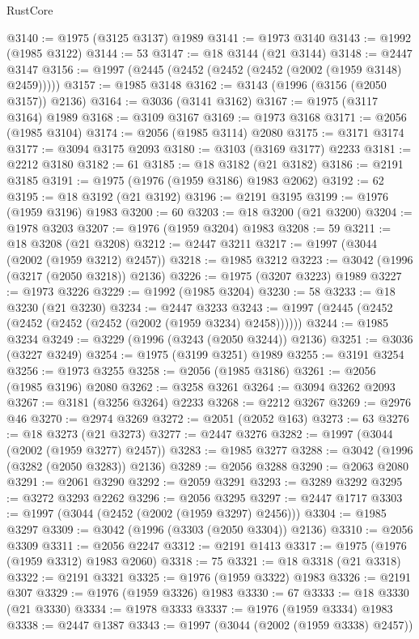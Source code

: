 \begin{lexlean}{RustCore}
\begin{coremodule}
@3140 := @1975 (@3125 @3137) @1989
@3141 := @1973 @3140
@3143 := @1992 (@1985 @3122)
@3144 := 53
@3147 := @18 @3144 (@21 @3144)
@3148 := @2447 @3147
@3156 := @1997 (@2445 (@2452 (@2452 (@2452 (@2002 (@1959 @3148) @2459)))))
@3157 := @1985 @3148
@3162 := @3143 (@1996 (@3156 (@2050 @3157)) @2136)
@3164 := @3036 (@3141 @3162)
@3167 := @1975 (@3117 @3164) @1989
@3168 := @3109 @3167
@3169 := @1973 @3168
@3171 := @2056 (@1985 @3104)
@3174 := @2056 (@1985 @3114) @2080
@3175 := @3171 @3174
@3177 := @3094 @3175 @2093
@3180 := @3103 (@3169 @3177) @2233
@3181 := @2212 @3180
@3182 := 61
@3185 := @18 @3182 (@21 @3182)
@3186 := @2191 @3185
@3191 := @1975 (@1976 (@1959 @3186) @1983 @2062)
@3192 := 62
@3195 := @18 @3192 (@21 @3192)
@3196 := @2191 @3195
@3199 := @1976 (@1959 @3196) @1983
@3200 := 60
@3203 := @18 @3200 (@21 @3200)
@3204 := @1978 @3203
@3207 := @1976 (@1959 @3204) @1983
@3208 := 59
@3211 := @18 @3208 (@21 @3208)
@3212 := @2447 @3211
@3217 := @1997 (@3044 (@2002 (@1959 @3212) @2457))
@3218 := @1985 @3212
@3223 := @3042 (@1996 (@3217 (@2050 @3218)) @2136)
@3226 := @1975 (@3207 @3223) @1989
@3227 := @1973 @3226
@3229 := @1992 (@1985 @3204)
@3230 := 58
@3233 := @18 @3230 (@21 @3230)
@3234 := @2447 @3233
@3243 := @1997 (@2445 (@2452 (@2452 (@2452 (@2452 (@2002 (@1959 @3234) @2458))))))
@3244 := @1985 @3234
@3249 := @3229 (@1996 (@3243 (@2050 @3244)) @2136)
@3251 := @3036 (@3227 @3249)
@3254 := @1975 (@3199 @3251) @1989
@3255 := @3191 @3254
@3256 := @1973 @3255
@3258 := @2056 (@1985 @3186)
@3261 := @2056 (@1985 @3196) @2080
@3262 := @3258 @3261
@3264 := @3094 @3262 @2093
@3267 := @3181 (@3256 @3264) @2233
@3268 := @2212 @3267
@3269 := @2976 @46
@3270 := @2974 @3269
@3272 := @2051 (@2052 @163)
@3273 := 63
@3276 := @18 @3273 (@21 @3273)
@3277 := @2447 @3276
@3282 := @1997 (@3044 (@2002 (@1959 @3277) @2457))
@3283 := @1985 @3277
@3288 := @3042 (@1996 (@3282 (@2050 @3283)) @2136)
@3289 := @2056 @3288
@3290 := @2063 @2080
@3291 := @2061 @3290
@3292 := @2059 @3291
@3293 := @3289 @3292
@3295 := @3272 @3293 @2262
@3296 := @2056 @3295
@3297 := @2447 @1717
@3303 := @1997 (@3044 (@2452 (@2002 (@1959 @3297) @2456)))
@3304 := @1985 @3297
@3309 := @3042 (@1996 (@3303 (@2050 @3304)) @2136)
@3310 := @2056 @3309
@3311 := @2056 @2247
@3312 := @2191 @1413
@3317 := @1975 (@1976 (@1959 @3312) @1983 @2060)
@3318 := 75
@3321 := @18 @3318 (@21 @3318)
@3322 := @2191 @3321
@3325 := @1976 (@1959 @3322) @1983
@3326 := @2191 @307
@3329 := @1976 (@1959 @3326) @1983
@3330 := 67
@3333 := @18 @3330 (@21 @3330)
@3334 := @1978 @3333
@3337 := @1976 (@1959 @3334) @1983
@3338 := @2447 @1387
@3343 := @1997 (@3044 (@2002 (@1959 @3338) @2457))

\end{coremodule}
\end{lexlean}
